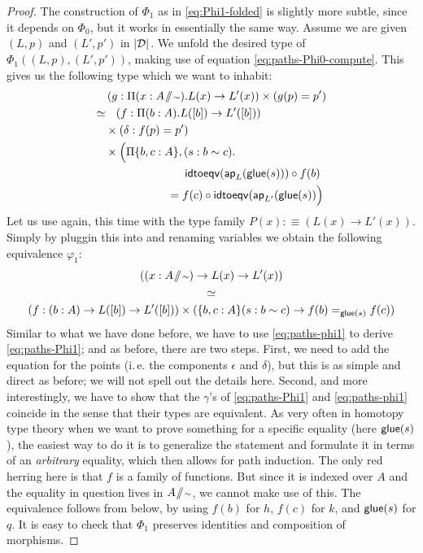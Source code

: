 \begin{proof}
The construction of $\Phi_1$ as in \eqref{eq:Phi1-folded} is slightly
more subtle, since it depends on $\Phi_0$, but it works in essentially the same way.
Assume we are given $(L, p)$ and $(L', p')$ in $\mathopen{}\left|\mathcal D\right|_{}^{}\mathclose{}$.
We unfold the desired type of $\Phi_1((L,p),(L',p'))$, making use of
equation \eqref{eq:paths-Phi0-compute}.
This gives us the following type which we want to inhabit:
 \begin{equation} \label{eq:paths-Phi1}
  \begin{alignedat}{2}
   &&& \left(g : \Pi(x : A \! \sslash \! {\scriptstyle \sim}). L(x) \to L'(x)\right) \times \left(g(p) = p'\right) \\
   \simeq &&& \phantom{\times} \left(f : \Pi(b : A). L([b]) \to L'([b])  \right) \\
           &&& \times (\delta: f(p) = p') \\
           &&& \times \Bigl( \Pi\{b,c : A\},(s : b \sim c). \\
           &&& \phantom{=========} \mathsf{idtoeqv}(\mathsf{ap}_L(\mathsf{glue}(s))) \circ f(b)  \\
           &&& \phantom{=======} = f(c) \circ \mathsf{idtoeqv}(\mathsf{ap}_{L'}(\mathsf{glue}(s)) \Bigr)
  \end{alignedat}
 \end{equation}
Let us use  again, this time with the
type family $P(x) :\equiv (L(x) \to L'(x))$.
Simply by pluggin this into  and renaming variables
we obtain the following equivalence $\varphi_1$:
\begin{equation}\label{eq:paths-phi1}
\begin{gathered}
((x : A \! \sslash \! {\scriptstyle \sim}) \to L(x) \to L'(x)) \\
\simeq \\
(f : (b : A) \to L([b]) \to L'([b])) \times (\{b, c : A\}(s : b \sim c) \to f(b) =_{\mathsf{glue}(s)} f(c))
\end{gathered}
\end{equation}
Similar to what we have done before, we have to use \eqref{eq:paths-phi1}
to derive \eqref{eq:paths-Phi1};
and as before, there are two steps.
First, we need to add the equation for the points (i.\,e. the components $\epsilon$
and $\delta$), but this is as simple and direct as before; we will not spell
out the details here.
Second, and more interestingly, we have to show that the $\gamma$'s of
\eqref{eq:paths-Phi1} and \eqref{eq:paths-phi1} coincide in the sense
that their types are equivalent.
As very often in homotopy type theory when we want to prove something for
a specific equality (here $\mathsf{glue}(s)$), the easiest way to do it is to
generalize the statement and formulate it in terms of an \emph{arbitrary}
equality,
which then allows for path induction.
The only red herring here is that $f$ is a family of functions.
But since it is indexed over $A$ and the equality in question lives in $A \! \sslash \! {\scriptstyle \sim}$,
we cannot make use of this.
The equivalence follows from  below,
by using $f(b)$ for $h$, $f(c)$ for $k$, and $\mathsf{glue}(s)$ for $q$.
It is easy to check that $\Phi_1$ preserves identities and composition of
morphisms.
\end{proof}

